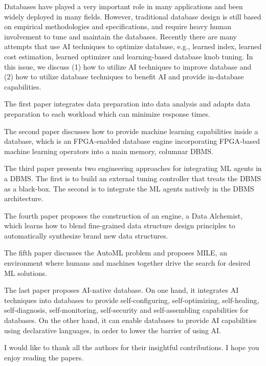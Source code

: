 \documentclass[11pt]{article}
\begin{document}
Databases have played a very important role in many applications and been widely deployed in many fields. However, traditional database design is still based on empirical methodologies and specifications,  and require heavy human involvement to tune and maintain the databases.   Recently there are many attempts that use AI techniques to optimize database, e.g., learned index, learned cost estimation, learned optimizer and learning-based database knob tuning. In this issue, we discuss (1) how to utilize AI techniques to improve database and (2) how to utilize database techniques to benefit AI and provide in-database capabilities. 

The first paper integrates data preparation into data analysis and adapts data preparation to each workload which can minimize response times.

The second paper discusses how to provide machine learning capabilities inside a database, which is an FPGA-enabled database engine incorporating FPGA-based machine learning operators into a main memory, columnar DBMS. 


The third paper presents two engineering approaches for integrating ML agents in a DBMS. The first is to build an external tuning controller that treats the DBMS as a black-box. The second is to integrate the ML agents natively in the DBMS architecture.  

The fourth paper proposes the construction of an engine, a Data Alchemist, which learns how to blend fine-grained data structure design principles to automatically synthesize brand new data structures.

The fifth paper discusses the AutoML problem and proposes MILE, an environment where humans and machines together drive the search for desired ML solutions. 

The last paper proposes AI-native database. On one hand, it integrates AI techniques into databases to provide self-configuring, self-optimizing, self-healing, self-diagnosis, self-monitoring, self-security and self-assembling capabilities for databases. On the other hand, it can enable databases to provide AI capabilities using declarative languages, in order to lower the barrier of using AI.  




I would like to thank all the authors for their insightful contributions. I hope you enjoy reading the papers. 
\end{document}
